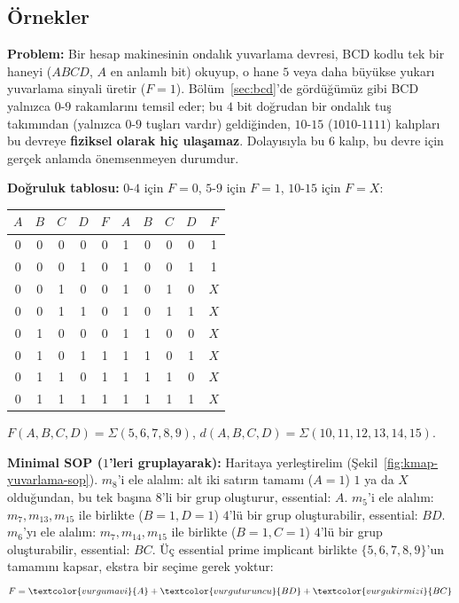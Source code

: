 \subsection{Örnekler}\label{sec:dont-care-ornek}
\begin{ornek}\label{orn:dontcare-yuvarlama}
\textbf{Problem:} Bir hesap makinesinin ondalık yuvarlama devresi, BCD kodlu tek
bir haneyi ($ABCD$, $A$ en anlamlı bit) okuyup, o hane $5$ veya daha büyükse
yukarı yuvarlama sinyali üretir ($F=1$). Bölüm~\ref{sec:bcd}'de gördüğümüz gibi
BCD yalnızca $0$-$9$ rakamlarını temsil eder; bu $4$ bit doğrudan bir ondalık
tuş takımından (yalnızca $0$-$9$ tuşları vardır) geldiğinden, $10$-$15$
($1010$-$1111$) kalıpları bu devreye \textbf{fiziksel olarak hiç ulaşamaz}.
Dolayısıyla bu $6$ kalıp, bu devre için gerçek anlamda önemsenmeyen durumdur.

\textbf{Doğruluk tablosu:} $0$-$4$ için $F=0$, $5$-$9$ için $F=1$, $10$-$15$ için
$F=X$:
\begin{center}
\begin{tabular}{cccc|c||cccc|c}
\toprule
$A$&$B$&$C$&$D$&$F$ & $A$&$B$&$C$&$D$&$F$\\
\midrule
0&0&0&0&0 & 1&0&0&0&1\\
0&0&0&1&0 & 1&0&0&1&1\\
0&0&1&0&0 & 1&0&1&0&$X$\\
0&0&1&1&0 & 1&0&1&1&$X$\\
0&1&0&0&0 & 1&1&0&0&$X$\\
0&1&0&1&1 & 1&1&0&1&$X$\\
0&1&1&0&1 & 1&1&1&0&$X$\\
0&1&1&1&1 & 1&1&1&1&$X$\\
\bottomrule
\end{tabular}
\end{center}
$F(A,B,C,D)=\Sigma(5,6,7,8,9)$, $d(A,B,C,D)=\Sigma(10,11,12,13,14,15)$.

\textbf{Minimal SOP ($1$'leri gruplayarak):} Haritaya yerleştirelim
(Şekil~\ref{fig:kmap-yuvarlama-sop}). $m_8$'i ele alalım: alt iki satırın
tamamı ($A=1$) $1$ ya da $X$ olduğundan, bu tek başına $8$'li bir grup oluşturur,
essential: $A$. $m_5$'i ele alalım: $m_7,m_{13},m_{15}$ ile birlikte ($B=1,D=1$)
$4$'lü bir grup oluşturabilir, essential: $BD$. $m_6$'yı ele alalım: $m_7,m_{14},m_{15}$
ile birlikte ($B=1,C=1$) $4$'lü bir grup oluşturabilir, essential: $BC$. Üç
essential prime implicant birlikte $\{5,6,7,8,9\}$'un tamamını kapsar, ekstra bir
seçime gerek yoktur:
\[
F = \textcolor{vurgumavi}{A} + \textcolor{vurguturuncu}{BD} + \textcolor{vurgukirmizi}{BC}
\]


\end{ornek}
